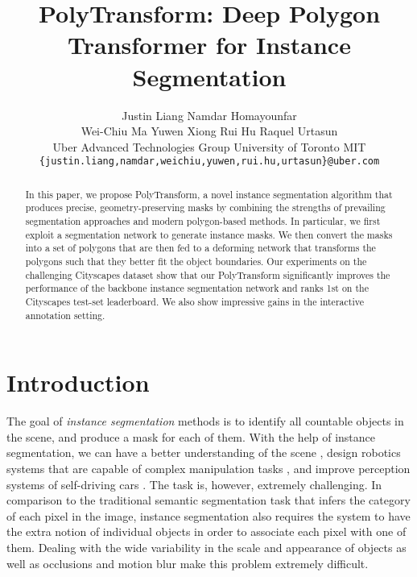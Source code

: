 \documentclass[10pt,twocolumn,letterpaper]{article}
\begin{document}
\title{PolyTransform: Deep Polygon Transformer for Instance Segmentation}

\author{
	Justin Liang \quad Namdar Homayounfar\\
	Wei-Chiu Ma \quad Yuwen Xiong \quad Rui Hu \quad Raquel Urtasun\\
	Uber Advanced Technologies Group \quad University of Toronto \quad  MIT\\
	\small\texttt{\{justin.liang,namdar,weichiu,yuwen,rui.hu,urtasun\}@uber.com}
}


\maketitle
\thispagestyle{empty}

\begin{abstract}

In this paper, we propose PolyTransform, a novel instance segmentation algorithm that produces precise, geometry-preserving masks by combining the strengths of prevailing segmentation approaches and modern polygon-based methods. 
 In particular, we first exploit a segmentation network to generate  instance masks. We then convert the masks into a set of polygons that are then fed to a deforming network that transforms the polygons such that they better fit the object boundaries. 
 Our experiments on the challenging Cityscapes dataset show that our PolyTransform significantly improves the performance of the backbone instance segmentation network and ranks 1st on the Cityscapes test-set leaderboard. 
We also show impressive gains in the  interactive annotation setting.
\end{abstract}

 
\vspace{-5mm}
\section{Introduction}
\vspace{-1mm}

The goal of {\it instance segmentation} methods is to identify all countable objects in the scene, and produce a mask for each of them. With the help of instance segmentation, we can have a better understanding of the scene \cite{zhou2017scene}, design robotics systems that are capable of complex manipulation tasks \cite{fazeli2019see}, and improve   perception systems of self-driving cars \cite{ma2019deep}. 
The task  is, however,  extremely challenging.
In comparison to the traditional semantic segmentation task that infers the category of each pixel in the image, instance segmentation also requires the system to have the extra notion of individual objects in order to associate each pixel with one of them. 
Dealing with the wide variability in the scale and appearance of objects as well as   occlusions and motion blur make this problem extremely difficult.   
\end{document}
